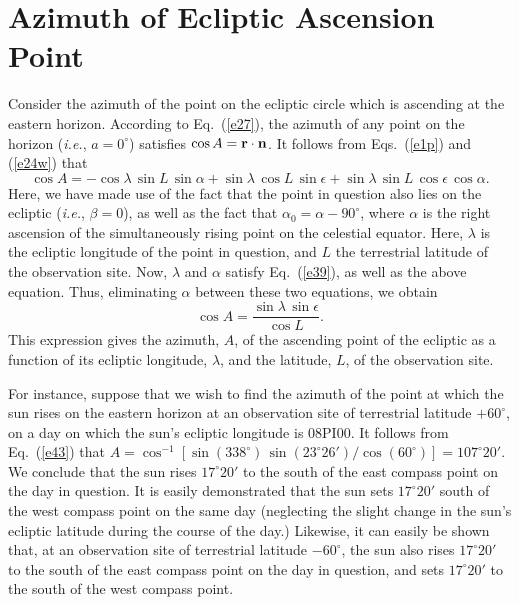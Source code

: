  \section{Azimuth of  Ecliptic Ascension Point}
Consider the azimuth of the point on the ecliptic circle which is ascending at the
eastern horizon.
 According to Eq.~(\ref{e27}),  the azimuth of any point on the horizon ({\em i.e.}, $a=0^\circ$) satisfies $\cos A = {\bf r}\cdot {\bf n}$. It
 follows from Eqs.~(\ref{e1p}) and (\ref{e24w}) that
 \begin{equation}
 \cos A= -\cos\lambda\,\sin L\,\sin\alpha + 
 \sin\lambda\,\cos L\,\sin \epsilon + \sin\lambda\,\sin L\,\cos\epsilon\,\cos\alpha.
\end{equation}
Here, we have made use of the fact that the point in question also lies on the
ecliptic ({\em i.e.}, $\beta=0$), as well as the fact that $\alpha_0=\alpha-90^\circ$,
where $\alpha$ is the right ascension of the simultaneously rising point on the celestial
equator. Here, $\lambda$ is the ecliptic longitude of the point in question, and $L$ the terrestrial latitude of the observation
site. 
Now, $\lambda$ and $\alpha$ satisfy Eq.~(\ref{e39}), as well as the above equation. Thus,
eliminating $\alpha$ between these two equations, we obtain
\begin{equation}\label{e43}
\cos A = \frac{\sin\lambda\,\sin\epsilon}{\cos L}.
\end{equation}
This expression gives the azimuth, $A$, of the ascending point of the ecliptic  as a function of
its ecliptic longitude, $\lambda$, and the latitude, $L$, of the
observation site.

For instance, suppose that we wish to find the azimuth of the point at which the sun rises on
the eastern horizon at an observation site of terrestrial latitude $+60^\circ$, on a day on which the sun's ecliptic longitude is 08PI00. It
follows from Eq.~(\ref{e43}) that $A= \cos^{-1}[\sin (338^\circ)\,\sin (23^\circ 26')/\cos (60^\circ)] = 107^\circ 20'$. We conclude  that the
sun rises $17^\circ 20'$ to the south of the east compass point on the
day in question. It is easily demonstrated that the sun sets $17^\circ 20'$ south of the west compass point
on the same day (neglecting the slight change in the sun's ecliptic latitude during the course of the day.)
Likewise, it can easily be shown that, at an observation site of terrestrial latitude $-60^\circ$, the
sun also rises $17^\circ 20'$ to the south of the east compass point on the day in question, and sets $17^\circ 20'$ to the south of
the west compass point. 
 
